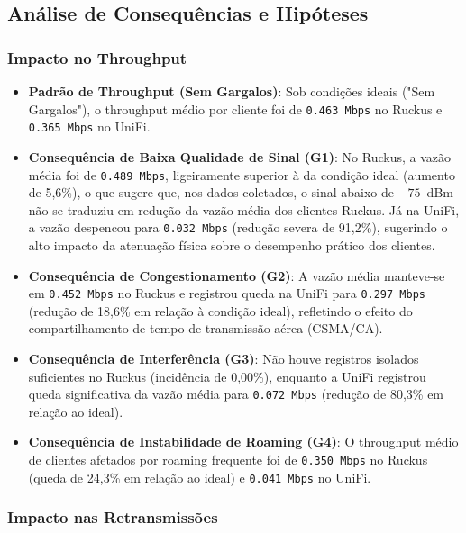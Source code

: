 \subsection{Análise de Consequências e Hipóteses}

\subsubsection{Impacto no Throughput}

\begin{itemize}
  \item \textbf{Padrão de Throughput (Sem Gargalos)}: Sob condições ideais ("Sem Gargalos"), o throughput médio por cliente foi de \texttt{0.463 Mbps} no Ruckus e \texttt{0.365 Mbps} no UniFi.
  \item \textbf{Consequência de Baixa Qualidade de Sinal (G1)}: No Ruckus, a vazão média foi de \texttt{0.489 Mbps}, ligeiramente superior à da condição ideal (aumento de 5,6\%), o que sugere que, nos dados coletados, o sinal abaixo de $-75$~dBm não se traduziu em redução da vazão média dos clientes Ruckus. Já na UniFi, a vazão despencou para \texttt{0.032 Mbps} (redução severa de 91,2\%), sugerindo o alto impacto da atenuação física sobre o desempenho prático dos clientes.
  \item \textbf{Consequência de Congestionamento (G2)}: A vazão média manteve-se em \texttt{0.452 Mbps} no Ruckus e registrou queda na UniFi para \texttt{0.297 Mbps} (redução de 18,6\% em relação à condição ideal), refletindo o efeito do compartilhamento de tempo de transmissão aérea (CSMA/CA).
  \item \textbf{Consequência de Interferência (G3)}: Não houve registros isolados suficientes no Ruckus (incidência de 0,00\%), enquanto a UniFi registrou queda significativa da vazão média para \texttt{0.072 Mbps} (redução de 80,3\% em relação ao ideal).
  \item \textbf{Consequência de Instabilidade de Roaming (G4)}: O throughput médio de clientes afetados por roaming frequente foi de \texttt{0.350 Mbps} no Ruckus (queda de 24,3\% em relação ao ideal) e \texttt{0.041 Mbps} no UniFi.

\end{itemize}
\subsubsection{Impacto nas Retransmissões}

